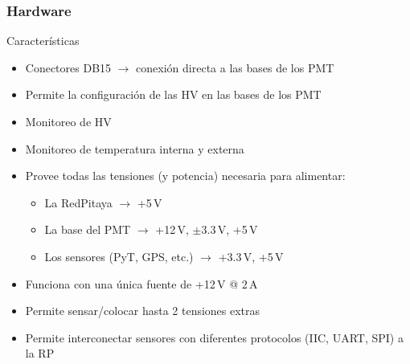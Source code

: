 \documentclass{beamer}
\begin{document}
\begin{frame}
	\frametitle{Hardware}
				\begin{exampleblock}{Características}
			\begin{itemize}
				\item Conectores DB15 $\to$ conexión directa a las bases de los PMT
				\item Permite la configuración de las HV en las bases de los PMT
				\item Monitoreo de HV
				\item Monitoreo de temperatura interna y externa
				\item Provee todas las tensiones (y potencia) necesaria para alimentar:
								\begin{itemize}
												\item La RedPitaya $\to$ \alert{+5\,V}
												\item La base del PMT $\to$ \alert{+12\,V, $\pm$3.3\,V,
																+5\,V}
												\item Los sensores (PyT, GPS, etc.) $\to$
																\alert{+3.3\,V, +5\,V}
								\end{itemize}
				\item Funciona con una única fuente de +12\,V @ 2\,A
				\item Permite sensar/colocar hasta 2 tensiones extras
				\item Permite interconectar sensores con diferentes protocolos (IIC,
								UART, SPI) a la RP
			\end{itemize}
		\end{exampleblock}
\end{frame}
\end{document}
